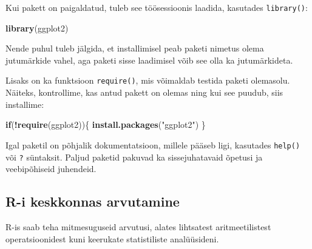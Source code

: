 \documentclass[
]{book}
\newenvironment{Shaded}{\begin{snugshade}}{\end{snugshade}}
\newcommand{\ControlFlowTok}[1]{\textcolor[rgb]{0.13,0.29,0.53}{\textbf{#1}}}
\newcommand{\FunctionTok}[1]{\textcolor[rgb]{0.13,0.29,0.53}{\textbf{#1}}}
\newcommand{\NormalTok}[1]{#1}
\newcommand{\SpecialCharTok}[1]{\textcolor[rgb]{0.81,0.36,0.00}{\textbf{#1}}}
\newcommand{\StringTok}[1]{\textcolor[rgb]{0.31,0.60,0.02}{#1}}
\renewenvironment{Shaded} {\begin{snugshade}\footnotesize} {\end{snugshade}}
\begin{document}
Kui pakett on paigaldatud, tuleb see töösessioonis laadida, kasutades \texttt{library()}:

\begin{Shaded}
\begin{Highlighting}[]
\FunctionTok{library}\NormalTok{(ggplot2)}
\end{Highlighting}
\end{Shaded}

Nende puhul tuleb jälgida, et installimisel peab paketi nimetus olema jutumärkide vahel, aga paketi sisse laadimisel võib see olla ka jutumärkideta.

Lisaks on ka funktsioon \texttt{require()}, mis võimaldab testida paketi olemasolu. Näiteks, kontrollime, kas antud pakett on olemas ning kui see puudub, siis installime:

\begin{Shaded}
\begin{Highlighting}[]
\ControlFlowTok{if}\NormalTok{(}\SpecialCharTok{!}\FunctionTok{require}\NormalTok{(ggplot2))\{}
    \FunctionTok{install.packages}\NormalTok{(}\StringTok{"ggplot2"}\NormalTok{)    }
\NormalTok{\}}
\end{Highlighting}
\end{Shaded}

Igal paketil on põhjalik dokumentatsioon, millele pääseb ligi, kasutades \texttt{help()} või \texttt{?} süntaksit. Paljud paketid pakuvad ka sissejuhatavaid õpetusi ja veebipõhiseid juhendeid.

\subsection{R-i keskkonnas arvutamine}\label{r-i-keskkonnas-arvutamine}

R-is saab teha mitmesuguseid arvutusi, alates lihtsatest aritmeetilistest operatsioonidest kuni keerukate statistiliste analüüsideni.
\end{document}
